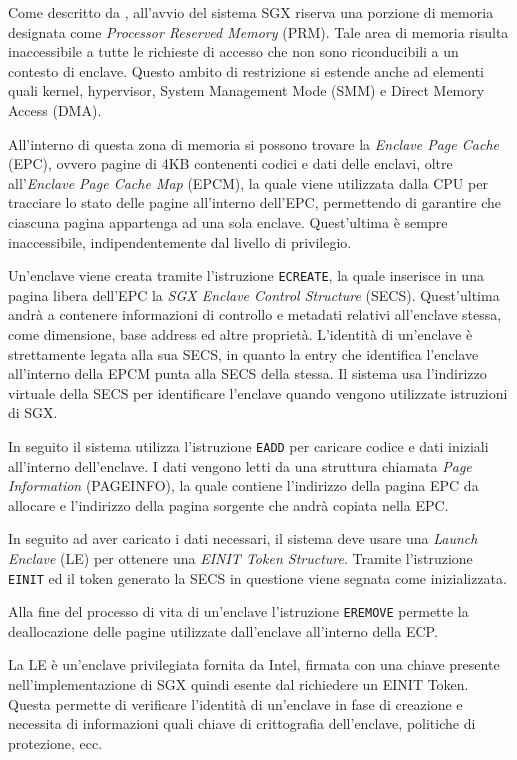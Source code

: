 \documentclass[12pt,italian]{report}
\begin{document}
	\bigbreak
	
	Come descritto da \cite{sgx_explained}, all'avvio del sistema SGX riserva una porzione di memoria designata come \textit{Processor Reserved Memory} (PRM). Tale area di memoria risulta inaccessibile a tutte le richieste di accesso che non sono riconducibili a un contesto di enclave. Questo ambito di restrizione si estende anche ad elementi quali kernel, hypervisor, System Management Mode (SMM) e Direct Memory Access (DMA).
	
	All'interno di questa zona di memoria si possono trovare la \textit{Enclave Page Cache} (EPC), ovvero pagine di 4KB contenenti codici e dati delle enclavi, oltre all'\textit{Enclave Page Cache Map} (EPCM), la quale viene utilizzata dalla CPU per tracciare lo stato delle pagine all'interno dell'EPC, permettendo di garantire che ciascuna pagina appartenga ad una sola enclave. Quest'ultima è sempre inaccessibile, indipendentemente dal livello di privilegio.
	
	\bigbreak
	
	Un'enclave viene creata tramite l'istruzione \texttt{ECREATE}, la quale inserisce in una pagina libera dell'EPC la \textit{SGX Enclave Control Structure} (SECS). Quest'ultima andrà a contenere informazioni di controllo e metadati relativi all'enclave stessa, come dimensione, base address ed altre proprietà. L'identità di un'enclave è strettamente legata alla sua SECS, in quanto la entry che identifica l'enclave all'interno della EPCM punta alla SECS della stessa. Il sistema usa l'indirizzo virtuale della SECS per identificare l'enclave quando vengono utilizzate istruzioni di SGX.
	
	In seguito il sistema utilizza l'istruzione \texttt{EADD} per caricare codice e dati iniziali all'interno dell'enclave. I dati vengono letti da una struttura chiamata \textit{Page Information} (PAGEINFO), la quale contiene l'indirizzo della pagina EPC da allocare e l'indirizzo della pagina sorgente che andrà copiata nella EPC.
	
	In seguito ad aver caricato i dati necessari, il sistema deve usare una \textit{Launch Enclave} (LE) per ottenere una \textit{EINIT Token Structure}. Tramite l'istruzione \texttt{EINIT} ed il token generato la SECS in questione viene segnata come inizializzata.
	
	Alla fine del processo di vita di un'enclave l'istruzione \texttt{EREMOVE} permette la deallocazione delle pagine utilizzate dall'enclave all'interno della ECP.
	
	La LE è un'enclave privilegiata fornita da Intel, firmata con una chiave presente nell'implementazione di SGX quindi esente dal richiedere un EINIT Token. Questa permette di verificare l'identità di un'enclave in fase di creazione e necessita di informazioni quali chiave di crittografia dell'enclave, politiche di protezione, ecc.
	
\end{document}
